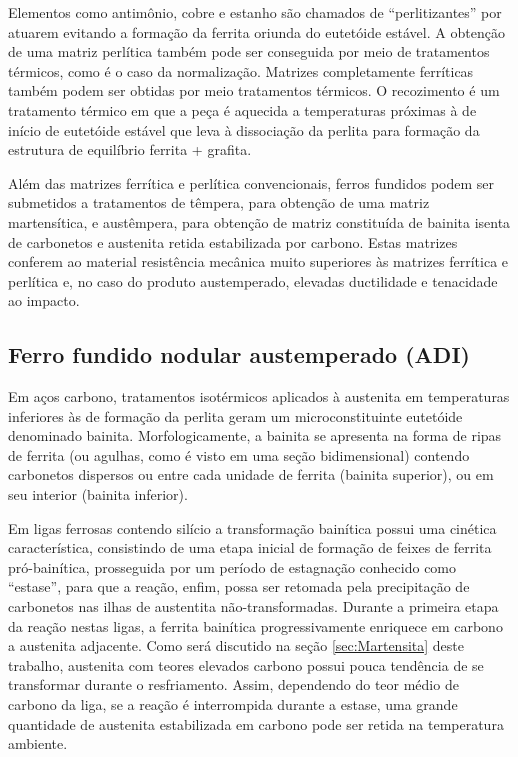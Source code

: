Elementos como antimônio, cobre e estanho são chamados de ``perlitizantes'' por atuarem evitando a formação da ferrita oriunda do eutetóide estável\cite{Kovacs1981}.
A obtenção de uma matriz perlítica também pode ser conseguida por meio de tratamentos térmicos, como é o caso da normalização. Matrizes completamente ferríticas também podem ser obtidas por meio tratamentos térmicos. O recozimento é um tratamento térmico em que a peça é aquecida a temperaturas próximas à de início de eutetóide estável que leva à dissociação da perlita para formação da estrutura de equilíbrio ferrita + grafita\cite{Guesser2009}.

Além das matrizes ferrítica e perlítica convencionais, ferros fundidos podem ser submetidos a tratamentos de têmpera, para obtenção de uma matriz martensítica, e austêmpera, para obtenção de matriz constituída de bainita isenta de carbonetos e austenita retida estabilizada por carbono. Estas matrizes conferem ao material resistência mecânica muito superiores às matrizes ferrítica e perlítica e, no caso do produto austemperado, elevadas ductilidade e tenacidade ao impacto\cite{Guesser2009}.

\subsection{Ferro fundido nodular austemperado (ADI)}

\label{subsec:ADI}

Em aços carbono, tratamentos isotérmicos aplicados à austenita em temperaturas inferiores às de formação da perlita geram um microconstituinte eutetóide denominado bainita. Morfologicamente, a bainita se apresenta na forma de ripas de ferrita (ou agulhas, como é visto em uma seção bidimensional) contendo carbonetos dispersos ou entre cada unidade de ferrita (bainita superior), ou em seu interior (bainita inferior).

Em ligas ferrosas contendo silício a transformação bainítica possui uma cinética característica, consistindo de uma etapa inicial de formação de feixes de ferrita pró-bainítica, prosseguida por um período de estagnação conhecido como ``estase'', para que a reação, enfim, possa ser retomada pela precipitação de carbonetos nas ilhas de austentita não-transformadas\cite{Goldenstein2002}. Durante a primeira etapa da reação nestas ligas, a ferrita bainítica progressivamente enriquece em carbono a austenita adjacente. Como será discutido na seção \ref{sec:Martensita} deste trabalho, austenita com teores elevados carbono possui pouca tendência de se transformar durante o resfriamento. Assim, dependendo do teor médio de carbono da liga, se a reação é interrompida durante a estase, uma grande quantidade de austenita estabilizada em carbono pode ser retida na temperatura ambiente.

